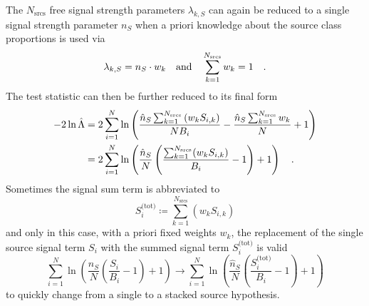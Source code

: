 The $N_\text{srcs}$ free signal strength parameters $\lambda_{k,S}$ can again be reduced to a single signal strength parameter $n_S$ when a priori knowledge about the source class proportions is used via
\begin{equation}
  \lambda_{k,S} = n_S \cdot w_k
  \quad\text{and}\quad
  \sum_{k=1}^{N_\text{srcs}} w_k = 1
  \quad\text{.}
\end{equation}
The test statistic can then be further reduced to its final form
\begin{align}
  -2\ln\hat{\Lambda}
  &= 2\sum_{i=1}^N \ln\left(
        \frac{\hat{n}_S \sum_{k=1}^{N_\text{srcs}}\left(w_k S_{i,k}\right)}
             {N B_i} -
        \frac{\hat{n}_S \sum_{k=1}^{N_\text{srcs}}w_k}{N} + 1
      \right) \\
  &= 2\sum_{i=1}^N \ln\left(
        \frac{\hat{n}_S}{N}\left(
          \frac{\sum_{k=1}^{N_\text{srcs}}(w_k S_{i,k})}{B_i} - 1
        \right) + 1
      \right)
  \quad\text{.}
\end{align}
Sometimes the signal sum term is abbreviated to
\begin{equation}
  S_i^\text{(tot)} \coloneqq \sum_{k=1}^{N_\text{srcs}}\left(w_k S_{i,k}\right)
\end{equation}
and only in this case, with a priori fixed weights $w_k$, the replacement of the single source signal term $S_i$ with the summed signal term $S_i^\text{(tot)}$ is valid
\begin{equation}
  \sum_{i=1}^N \ln\left(
      \frac{\hat{n}_S}{N}\left( \frac{S_i}{B_i} - 1 \right) + 1
    \right)
  \rightarrow
  \sum_{i=1}^N \ln\left(
      \frac{\hat{n}_S}{N}\left( \frac{S_i^\text{(tot)}}{B_i} - 1 \right) + 1
    \right)
\end{equation}
to quickly change from a single to a stacked source hypothesis.

